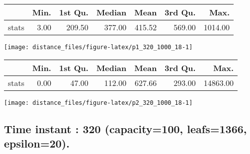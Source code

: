 \documentclass[
  9pt,
  landscape]{article}
\begin{document}
\begin{minipage}{0.5\textwidth} 
\centering 
\begin{tabular}{rrrrrrr}
  \hline
 & Min. & 1st Qu. & Median & Mean & 3rd Qu. & Max. \\ 
  \hline
stats & 3.00 & 209.50 & 377.00 & 415.52 & 569.00 & 1014.00 \\ 
   \hline
\end{tabular}
\vspace{0.5cm} 


\texttt{[image: distance\_files/figure-latex/p1\_320\_1000\_18-1]} 

\end{minipage} 
\begin{minipage}{0.5\textwidth} 
\centering 
\begin{tabular}{rrrrrrr}
  \hline
 & Min. & 1st Qu. & Median & Mean & 3rd Qu. & Max. \\ 
  \hline
stats & 0.00 & 47.00 & 112.00 & 627.66 & 293.00 & 14863.00 \\ 
   \hline
\end{tabular}
\vspace{0.5cm} 


\texttt{[image: distance\_files/figure-latex/p2\_320\_1000\_18-1]} 

\end{minipage}

\pagebreak

\hypertarget{time-instant-320-capacity100-leafs1366-epsilon20.}{%
\subsection{Time instant : 320 (capacity=100, leafs=1366,
epsilon=20).}\label{time-instant-320-capacity100-leafs1366-epsilon20.}}
\end{document}
